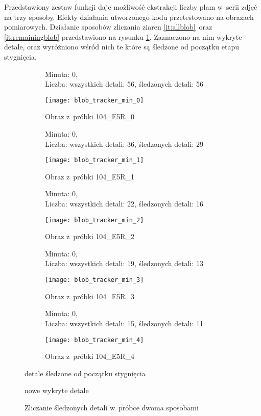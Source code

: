Przedstawiony zestaw funkcji daje możliwość ekstrakcji liczby plam
w~serii zdjęć na trzy sposoby.
Efekty działania utworzonego kodu przetestowano na obrazach pomiarowych.
Działanie sposobów zliczania ziaren \ref{it:allblob}~oraz
\ref{it:remainingblob} przedstawiono na rysunku \ref{fig:blobcount}.
Zaznaczono na nim wykryte detale, oraz wyróżniono wśród nich te które
są śledzone od początku etapu stygnięcia.
\begin{figure}[htbp]
	\centering
	\hfill
	\begin{subfigure}[t]{0.45\textwidth}
	    \centering
	    \caption*{\scriptsize
	        Minuta: 0, \\
	        Liczba: wszystkich detali: 56, śledzonych detali: 56}
		\texttt{[image: blob\_tracker\_min\_0]}
		\caption{Obraz z~próbki 104\_E5R\_0}
	\end{subfigure}
	\hfill
	\begin{subfigure}[t]{0.45\textwidth}
    	\centering
	    \caption*{\scriptsize
	        Minuta: 0, \\
	        Liczba: wszystkich detali: 36, śledzonych detali: 29}
		\texttt{[image: blob\_tracker\_min\_1]}
		\caption{Obraz z~próbki 104\_E5R\_1}
	\end{subfigure}
	\hfill
	\vfill
	\hfill
	\begin{subfigure}[t]{0.45\textwidth}
        \centering
	    \caption*{\scriptsize
	        Minuta: 0, \\
	        Liczba: wszystkich detali: 22, śledzonych detali: 16}
		\texttt{[image: blob\_tracker\_min\_2]}
		\caption{Obraz z~próbki 104\_E5R\_2}
	\end{subfigure}
	\hfill
	\begin{subfigure}[t]{0.45\textwidth}
    	\centering
	    \caption*{\scriptsize
	        Minuta: 0, \\
	        Liczba: wszystkich detali: 19, śledzonych detali: 13}
		\texttt{[image: blob\_tracker\_min\_3]}
		\caption{Obraz z~próbki 104\_E5R\_3}
	\end{subfigure}
	\hfill
	\vfill
	\begin{subfigure}[t]{0.45\textwidth}
    	\centering
	    \caption*{\scriptsize
	        Minuta: 0, \\
	        Liczba: wszystkich detali: 15, śledzonych detali: 11}
		\texttt{[image: blob\_tracker\_min\_4]}
		\caption{Obraz z~próbki 104\_E5R\_4}
	\end{subfigure}
		\begin{description} \footnotesize
	    \centering
        \item[Kolor czerwony] detale śledzone od początku stygnięcia
        \item[Kolor niebieski] nowe wykryte detale
	\end{description}
	\caption{Zliczanie śledzonych detali w~próbce dwoma sposobami}
	\label{fig:blobcount}
\end{figure}

